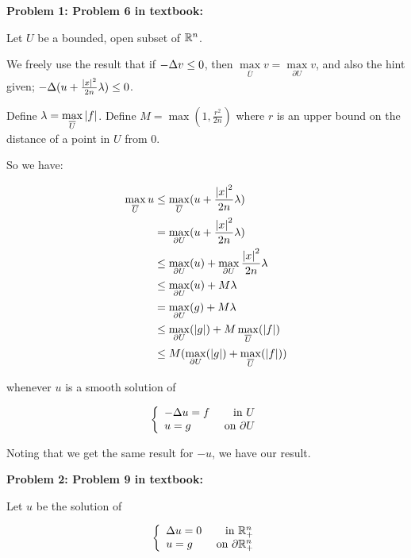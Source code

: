\documentclass[a4paper,12pt]{article}
\begin{document}
{\bf Problem 1: Problem 6 in textbook:}

Let $U$ be a bounded, open subset of $\mathbb{R}^n$.

We freely use the result that if $-\Delta v \leq 0$, then $\max\limits_{\overline{U}} v = \max\limits_{\partial U} v$, and also the hint given; $-\Delta(u + \frac{\left\lvert x \right\rvert^2}{2n} \lambda) \leq 0$. %

Define $\lambda = \max\limits_{\overline{U}} \left\lvert f \right\rvert$. Define $M = \max(1,\frac{r^2}{2n})$ where $r$ is an upper bound on the distance of a point in $U$ from $0$.

So we have:

\begin{align*}
\max\limits_{\overline{U}} u &\leq \max\limits_{\overline{U}} (u + \frac{\left\lvert x \right\rvert^2}{2n} \lambda) \\
&= \max\limits_{\partial U} (u + \frac{\left\lvert x \right\rvert^2}{2n} \lambda)\\
&\leq \max\limits_{\partial U} (u) +\max\limits_{\partial U} \frac{\left\lvert x \right\rvert^2}{2n} \lambda\\
&\leq \max\limits_{\partial U} (u) +M \lambda\\
&= \max\limits_{\partial U} (g) +M \lambda\\
&\leq \max\limits_{\partial U} (\left\lvert g \right\rvert) + M \max\limits_{\overline{U}} (\left\lvert f \right\rvert)\\
&\leq M(\max\limits_{\partial U} (\left\lvert g \right\rvert) + \max\limits_{\overline{U}} (\left\lvert f \right\rvert))\\
\end{align*} 

whenever $u$ is a smooth solution of

\begin{displaymath}
   \left\{
     \begin{array}{lr}
       -\Delta u = f & \text{ in } U\\
       u=g & \text{ on }\partial U
     \end{array}
   \right.
\end{displaymath}

Noting that we get the same result for $-u$, we have our result.

\shunt

{\bf Problem 2: Problem 9 in textbook:}

Let $u$ be the solution of 

\begin{displaymath}
   \left\{
     \begin{array}{lr}
       \Delta u = 0 & \text{ in } \mathbb{R}_+^n\\
       u=g & \text{ on }\partial \mathbb{R}_+^n
     \end{array}
   \right.
\end{displaymath}
\end{document}
